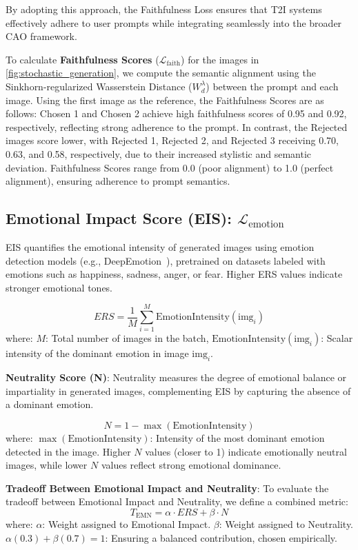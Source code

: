 By adopting this approach, the Faithfulness Loss ensures that T2I systems effectively adhere to user prompts while integrating seamlessly into the broader CAO framework.

To calculate \textbf{Faithfulness Scores} (\(\mathcal{L}_{\text{faith}}\)) for the images in \cref{fig:stochastic_generation}, we compute the semantic alignment using the Sinkhorn-regularized Wasserstein Distance (\(W_d^\lambda\)) between the prompt and each image. Using the first image as the reference, the Faithfulness Scores are as follows: Chosen 1 and Chosen 2 achieve high faithfulness scores of 0.95 and 0.92, respectively, reflecting strong adherence to the prompt. In contrast, the Rejected images score lower, with Rejected 1, Rejected 2, and Rejected 3 receiving 0.70, 0.63, and 0.58, respectively, due to their increased stylistic and semantic deviation. Faithfulness Scores range from 0.0 (poor alignment) to 1.0 (perfect alignment), ensuring adherence to prompt semantics.




\subsection{Emotional Impact Score (EIS): \(\mathcal{L}_{\text{emotion}}\)}
EIS quantifies the emotional intensity of generated images using emotion detection models (e.g., DeepEmotion~\cite{abidin2018deepemotion}), pretrained on datasets labeled with emotions such as happiness, sadness, anger, or fear. Higher ERS values indicate stronger emotional tones.

\[ERS = \frac{1}{M} \sum_{i=1}^M \text{EmotionIntensity}(\text{img}_i)
\]
where: \( M \): Total number of images in the batch, \( \text{EmotionIntensity}(\text{img}_i) \): Scalar intensity of the dominant emotion in image \(\text{img}_i\).

\textbf{Neutrality Score (N)}: Neutrality measures the degree of emotional balance or impartiality in generated images, complementing EIS by capturing the absence of a dominant emotion.

\[
N = 1 - \max(\text{EmotionIntensity})
\]
where: \( \max(\text{EmotionIntensity}) \): Intensity of the most dominant emotion detected in the image. Higher \( N \) values (closer to 1) indicate emotionally neutral images, while lower \( N \) values reflect strong emotional dominance.

\textbf{Tradeoff Between Emotional Impact and Neutrality}: To evaluate the tradeoff between Emotional Impact and Neutrality, we define a combined metric:
\[T_{\text{EMN}} = \alpha \cdot ERS + \beta \cdot N
\]
where: \( \alpha \): Weight assigned to Emotional Impact. \( \beta \): Weight assigned to Neutrality. \( \alpha (0.3) + \beta (0.7) = 1 \): Ensuring a balanced contribution, chosen empirically.

